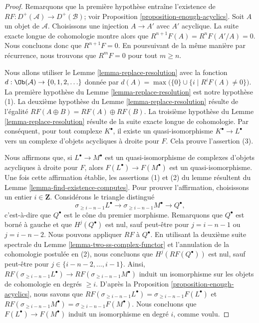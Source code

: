\begin{proof}
Remarquons que la première hypothèse entraîne l'existence de
$RF : D^+(\mathcal{A}) \to D^+(\mathcal{B})$; voir
Proposition \ref{proposition-enough-acyclics}.
Soit $A$ un objet de $\mathcal{A}$. Choisissons une injection $A \to A'$
avec $A'$ acyclique. La suite exacte longue de cohomologie montre alors que
$R^{n + 1}F(A) = R^nF(A'/A) = 0$. Nous concluons donc que
$R^{n + 1}F = 0$. En poursuivant de la même manière par récurrence, nous
trouvons que $R^mF = 0$ pour tout $m \geq n$.

\medskip\noindent
Nous allons utiliser le Lemme \ref{lemma-replace-resolution} avec la fonction
$d : \Ob(\mathcal{A}) \to \{0, 1, 2, \ldots \}$ donnée par
$d(A) = \max\bigl(\{0\} \cup \{i \mid R^iF(A) \not = 0\}\bigr)$.
La première hypothèse du Lemme \ref{lemma-replace-resolution} est notre
hypothèse (1). La deuxième hypothèse du
Lemme \ref{lemma-replace-resolution} résulte de l'égalité
$RF(A \oplus B) = RF(A) \oplus RF(B)$. La troisième hypothèse du
Lemme \ref{lemma-replace-resolution} résulte de la suite exacte longue de
cohomologie. Par conséquent, pour tout complexe $K^\bullet$, il existe un
quasi-isomorphisme $K^\bullet \to L^\bullet$ vers un complexe d'objets
acycliques à droite pour $F$. Cela prouve l'assertion (3).

\medskip\noindent
Nous affirmons que, si $L^\bullet \to M^\bullet$ est un quasi-isomorphisme de
complexes d'objets acycliques à droite pour $F$, alors
$F(L^\bullet) \to F(M^\bullet)$ est un quasi-isomorphisme. Une fois cette
affirmation établie, les assertions (1) et (2) du lemme résultent du
Lemme \ref{lemma-find-existence-computes}.
Pour prouver l'affirmation, choisissons un entier $i \in \mathbf{Z}$.
Considérons le triangle distingué
$$
\sigma_{\geq i - n - 1}L^\bullet \to
\sigma_{\geq i - n - 1}M^\bullet \to Q^\bullet,
$$
c'est-à-dire que $Q^\bullet$ est le cône du premier morphisme.
Remarquons que $Q^\bullet$ est borné à gauche et que $H^j(Q^\bullet)$ est nul,
sauf peut-être pour $j = i - n - 1$ ou $j = i - n - 2$.
Nous pouvons appliquer $RF$ à $Q^\bullet$.
En utilisant la deuxième suite spectrale du
Lemme \ref{lemma-two-ss-complex-functor} et l'annulation de la cohomologie
postulée en (2), nous concluons que $H^j(RF(Q^\bullet))$ est nul, sauf
peut-être pour $j \in \{i - n - 2, \ldots, i - 1\}$. Ainsi,
$RF(\sigma_{\geq i - n - 1}L^\bullet) \to RF(\sigma_{\geq i - n - 1}M^\bullet)$
induit un isomorphisme sur les objets de cohomologie en degrés $\geq i$.
D'après la Proposition \ref{proposition-enough-acyclics}, nous savons que
$RF(\sigma_{\geq i - n - 1}L^\bullet) = \sigma_{\geq i - n - 1}F(L^\bullet)$
et
$RF(\sigma_{\geq i - n - 1}M^\bullet) = \sigma_{\geq i - n - 1}F(M^\bullet)$.
Nous concluons que $F(L^\bullet) \to F(M^\bullet)$ induit un isomorphisme en
degré $i$, comme voulu.


\end{proof}
